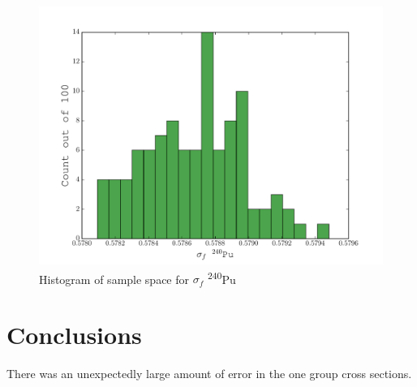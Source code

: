 \documentclass[11pt,notitlepage]{article}
\newcommand{\tss}{\textsuperscript}
\begin{document}
  \begin{figure}[H]
    \begin{center}
      \includegraphics[width=0.77\columnwidth]{../Origen2/94Pu240fHIST.pdf}
      \vspace{-5mm}
      \caption{Histogram of sample space for $\sigma_f$ \tss{240}Pu}
      \label{fig:SPu240f}
    \end{center}
  \end{figure}



\section{Conclusions}

There was an unexpectedly large amount of error in the
one group cross sections.



\end{document}
